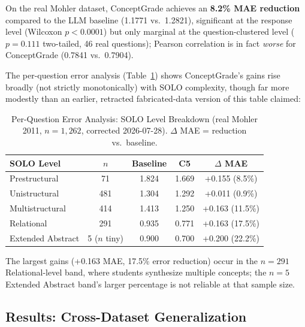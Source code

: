 \documentclass[journal,review]{vgtc}
\begin{document}
On the real Mohler dataset, ConceptGrade achieves an \textbf{8.2\% MAE reduction} compared to the LLM baseline (1.1771 vs.\ 1.2821), significant at the response level (Wilcoxon $p<0.0001$) but only marginal at the question-clustered level ($p=0.111$ two-tailed, 46 real questions); Pearson correlation is in fact \emph{worse} for ConceptGrade (0.7841 vs.\ 0.7904).

The per-question error analysis (Table~\ref{tab:per_question}) shows ConceptGrade's gains rise broadly (not strictly monotonically) with SOLO complexity, though far more modestly than an earlier, retracted fabricated-data version of this table claimed:

\begin{table}[ht]
\centering
\caption{Per-Question Error Analysis: SOLO Level Breakdown (real Mohler 2011, $n=1{,}262$, corrected 2026-07-28). $\Delta$ MAE = reduction vs.\ baseline.}
\label{tab:per_question}
\small
\begin{tabular}{lcccc}
\toprule
\textbf{SOLO Level} & \textbf{$n$} & \textbf{Baseline} & \textbf{C5} & \textbf{$\Delta$ MAE} \\
\midrule
Prestructural & 71 & 1.824 & 1.669 & +0.155 (8.5\%) \\
Unistructural & 481 & 1.304 & 1.292 & +0.011 (0.9\%) \\
Multistructural & 414 & 1.413 & 1.250 & +0.163 (11.5\%) \\
Relational & 291 & 0.935 & 0.771 & +0.163 (17.5\%) \\
Extended Abstract & 5 ($n$ tiny) & 0.900 & 0.700 & +0.200 (22.2\%) \\
\bottomrule
\end{tabular}
\end{table}

The largest gains (+0.163 MAE, 17.5\% error reduction) occur in the $n=291$ Relational-level band, where students synthesize multiple concepts; the $n=5$ Extended Abstract band's larger percentage is not reliable at that sample size.

\subsection{Results: Cross-Dataset Generalization}
\end{document}
